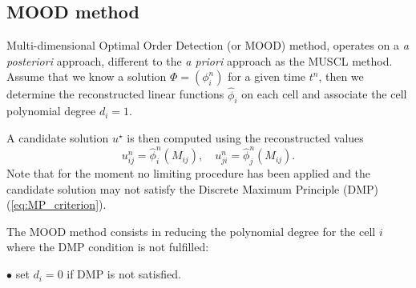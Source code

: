 \subsection{MOOD method}
\label{sec:420}

Multi-dimensional Optimal Order Detection (or MOOD) method, operates on a \textit{a posteriori} approach, different to the \textit{a priori} approach as the MUSCL method. Assume that we know a solution
$\Phi=(\phi^n_i)$ for a given time $t^n$, then we determine the reconstructed linear functions
$\widehat \phi_i$ on each cell and associate the cell polynomial degree $d_i=1$. 

A candidate solution $u^{\star}$ is then computed using the reconstructed values
$$
u_{ij}^n=\widehat \phi^n_i(M_{ij}),\quad u_{ji}^n=\widehat \phi^n_j(M_{ij}).
$$ 
Note that for the moment no limiting procedure has been applied and the candidate solution may not
satisfy the Discrete Maximum Principle (DMP)(\ref{eq:MP_criterion}).

The MOOD method consists in reducing the polynomial degree for the cell $i$ where the DMP condition
is not fulfilled:

$\bullet$  set $d_i=0$ if DMP is not satisfied.

